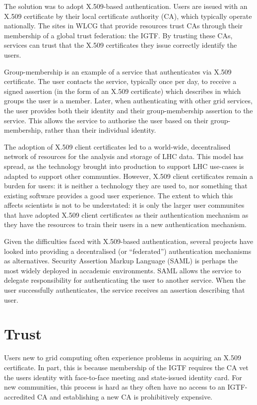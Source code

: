 \documentclass[a4paper]{jpconf}
\begin{document}
The solution was to adopt X.509-based authentication.  Users are
issued with an X.509 certificate by their local certificate authority
(CA), which typically operate nationally.  The sites in WLCG that
provide resources trust CAs through their membership of a global trust
federation: the IGTF.  By trusting these CAs, services can trust that
the X.509 certificates they issue correctly identify the users.

Group-membership is an example of a service that authenticates via
X.509 certificate.  The user contacts the service, typically once per
day, to receive a signed assertion (in the form of an X.509
certificate) which describes in which groups the user is a member.
Later, when authenticating with other grid services, the user provides
both their identity and their group-membership assertion to the
service.  This allows the service to authorise the user based on their
group-membership, rather than their individual identity.

The adoption of X.509 client certificates led to a world-wide,
decentralised network of resources for the analysis and storage of LHC
data.  This model has spread, as the technology brought into
production to support LHC use-cases is adapted to support other
communties.  However, X.509 client certificates remain a burden for
users: it is neither a technology they are used to, nor something that
existing software provides a good user experience.  The extent to
which this affects scientists is not to be understated: it is only the
larger user communites that have adopted X.509 client certificates as
their authentication mechanism as they have the resources to train
their users in a new authentication mechanism.

Given the difficulties faced with X.509-based authentication, several
projects have looked into providing a decentralised (or ``federated'')
authentication mechanisms as alternatives.  Security Assertion Markup
Language (SAML) is perhaps the most widely deployed in accademic
environments.  SAML allows the service to delegate responsibility for
authenticating the user to another service.  When the user
successfully authenticates, the service receives an assertion
describing that user.

\section{Trust}

Users new to grid computing often experience problems in acquiring an
X.509 certificate.  In part, this is because membership of the IGTF
requires the CA vet the users identity with face-to-face meeting and
state-issued identity card.  For new communities, this process is hard
as they often have no access to an IGTF-accredited CA and establishing
a new CA is prohibitively expensive.
\end{document}
